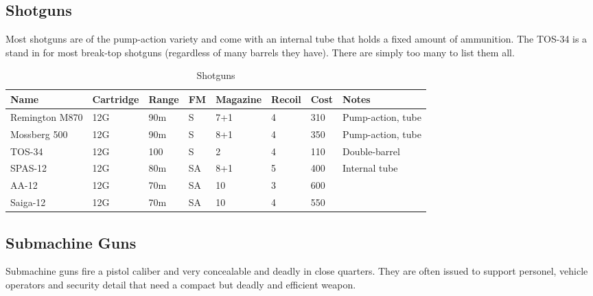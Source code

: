 \subsection{Shotguns}

Most shotguns are of the pump-action variety and come with an internal tube that
holds a fixed amount of ammunition. The TOS-34 is a stand in for most break-top
shotguns (regardless of many barrels they have). There are simply too many to
list them all.

\begin{table}
  \caption{Shotguns}
  \begin{center}
    \begin{tabular}{| l | l | l | l | l | l | l | l |}
      \hline
      \textbf{Name} & \textbf{Cartridge} & \textbf{Range} &
      \textbf{FM} & \textbf{Magazine} & \textbf{Recoil} &
      \textbf{Cost} & \textbf{Notes} \\ \hline

      Remington M870 & 12G & 90m & S  & 7+1 & 4 & 310 & Pump-action, tube \\ \hline
      Mossberg 500   & 12G & 90m & S  & 8+1 & 4 & 350 & Pump-action, tube \\ \hline
      TOS-34         & 12G & 100 & S  & 2   & 4 & 110 & Double-barrel \\ \hline
      SPAS-12        & 12G & 80m & SA & 8+1 & 5 & 400 & Internal tube \\ \hline
      AA-12          & 12G & 70m & SA & 10  & 3 & 600 & \\ \hline
      Saiga-12       & 12G & 70m & SA & 10  & 4 & 550 & \\ \hline

    \end{tabular}
  \end{center}
\end{table}

\subsection{Submachine Guns}

Submachine guns fire a pistol caliber and very concealable and deadly in close
quarters. They are often issued to support personel, vehicle operators and
security detail that need a compact but deadly and efficient weapon.

